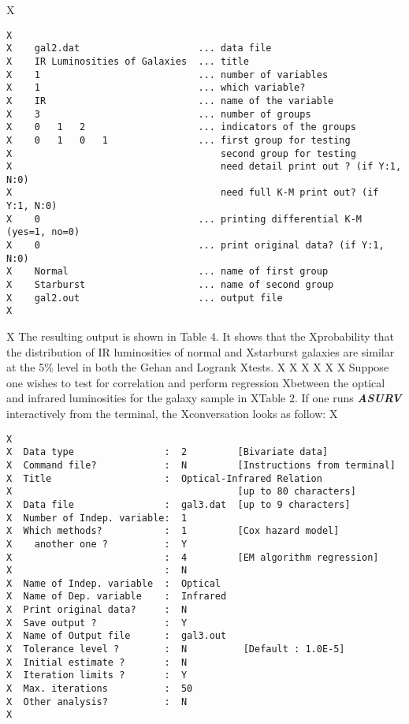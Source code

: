 X\begin{verbatim}
X 
X    gal2.dat                     ... data file                   
X    IR Luminosities of Galaxies  ... title                      
X    1                            ... number of variables      
X    1                            ... which variable?         
X    IR                           ... name of the variable   
X    3                            ... number of groups        
X    0   1   2                    ... indicators of the groups   
X    0   1   0   1                ... first group for testing 
X                                     second group for testing
X                                     need detail print out ? (if Y:1, N:0)
X                                     need full K-M print out? (if Y:1, N:0)
X    0                            ... printing differential K-M (yes=1, no=0)
X    0                            ... print original data? (if Y:1, N:0)
X    Normal                       ... name of first group    
X    Starburst                    ... name of second group        
X    gal2.out                     ... output file               
X\end{verbatim} 
X     The resulting output is shown in Table 4. It shows that the
Xprobability that the distribution of IR luminosities of normal and 
Xstarburst galaxies are similar at the 5\% level in both the Gehan and Logrank 
Xtests.
X
X\bigskip
X\bigskip
X
X
X       Suppose one wishes to test for correlation and perform regression
Xbetween the optical and infrared luminosities for the galaxy sample in
XTable 2. If one  runs {\sl\bf ASURV} interactively from the terminal, the
Xconversation looks as follow:
X\begin{verbatim} 
X
X  Data type                :  2         [Bivariate data]
X  Command file?            :  N         [Instructions from terminal]
X  Title                    :  Optical-Infrared Relation 
X                                        [up to 80 characters]
X  Data file                :  gal3.dat  [up to 9 characters]
X  Number of Indep. variable:  1
X  Which methods?           :  1         [Cox hazard model]
X    another one ?          :  Y
X                           :  4         [EM algorithm regression] 
X                           :  N
X  Name of Indep. variable  :  Optical
X  Name of Dep. variable    :  Infrared
X  Print original data?     :  N
X  Save output ?            :  Y
X  Name of Output file      :  gal3.out 
X  Tolerance level ?        :  N          [Default : 1.0E-5]
X  Initial estimate ?       :  N
X  Iteration limits ?       :  Y 
X  Max. iterations          :  50
X  Other analysis?          :  N
X\end{verbatim} 
